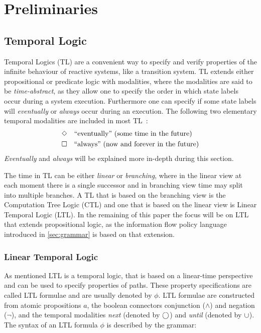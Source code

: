 \section{Preliminaries}\label{sec:preliminaries}

\subsection{Temporal Logic}
Temporal Logics (TL) are a convenient way to specify and verify properties of the infinite behaviour of reactive systems, like a transition system. TL extends either propositional or predicate logic with modalities, where the modalities are said to be \emph{time-abstract}, as they allow one to specify the order in which state labels occur during a system execution. Furthermore one can specify if some state labels will \emph{eventually} or \emph{always} occur during an execution. The following two elementary temporal modalities are included in most TL~\cite{baier2008principles}:
\begin{align*}
    &\Diamond \quad \text{``eventually'' (some time in the future)}\\
    &\square \quad \text{``always'' (now and forever in the future)}
\end{align*}
\emph{Eventually} and \emph{always} will be explained more in-depth during this section. 

The time in TL can be either \emph{linear} or \emph{branching}, where in the linear view at each moment there is a single successor and in branching view time may split into multiple branches. A TL that is based on the branching view is the Computation Tree Logic (CTL) and one that is based on the linear view is Linear Temporal Logic (LTL). In the remaining of this paper the focus will be on LTL that extends propositional logic, as the information flow policy language introduced in \autoref{sec:grammar} is based on that extension.

\subsubsection{Linear Temporal Logic}\label{sec:ltl}
As mentioned LTL is a temporal logic, that is based on a linear-time perspective and can be used to specify properties of paths. These property specifications are called LTL formulae and are usually denoted by $\phi$. LTL formulae are constructed from atomic propositions $a$, the boolean connectors conjunction ($\land$) and negation ($\lnot$), and the temporal modalities \emph{next} (denoted by $\bigcirc$) and \emph{until} (denoted by $\cup$). The syntax of an LTL formula $\phi$ is described by the grammar:

